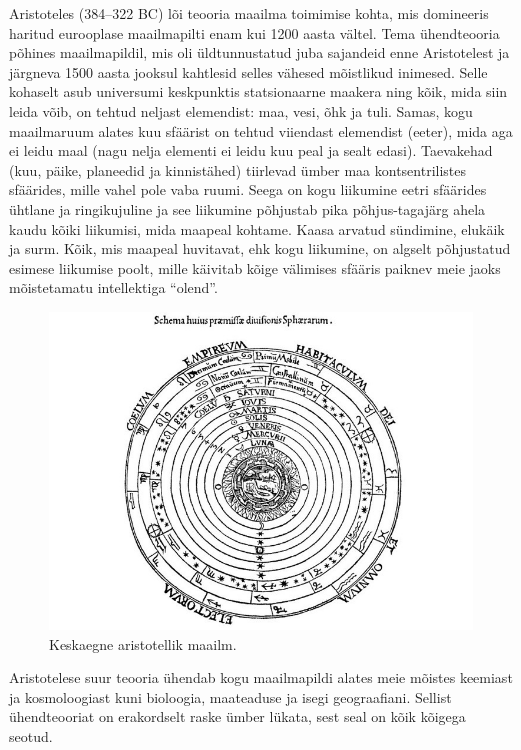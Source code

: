 \documentclass[]{book}
\begin{document}
Aristoteles (384--322 BC) lõi teooria maailma toimimise kohta, mis domineeris haritud eurooplase maailmapilti enam kui 1200 aasta vältel.
Tema ühendteooria põhines maailmapildil, mis oli üldtunnustatud juba sajandeid enne Aristotelest ja järgneva 1500 aasta jooksul kahtlesid selles vähesed mõistlikud inimesed.
Selle kohaselt asub universumi keskpunktis statsionaarne maakera ning kõik, mida siin leida võib, on tehtud neljast elemendist: maa, vesi, õhk ja tuli.
Samas, kogu maailmaruum alates kuu sfäärist on tehtud viiendast elemendist (eeter), mida aga ei leidu maal (nagu nelja elementi ei leidu kuu peal ja sealt edasi).
Taevakehad (kuu, päike, planeedid ja kinnistähed) tiirlevad ümber maa kontsentrilistes sfäärides, mille vahel pole vaba ruumi.
Seega on kogu liikumine eetri sfäärides ühtlane ja ringikujuline ja see liikumine põhjustab pika põhjus-tagajärg ahela kaudu kõiki liikumisi, mida maapeal kohtame.
Kaasa arvatud sündimine, elukäik ja surm.
Kõik, mis maapeal huvitavat, ehk kogu liikumine, on algselt põhjustatud esimese liikumise poolt, mille käivitab kõige välimises sfääris paiknev meie jaoks mõistetamatu intellektiga ``olend''.

\begin{figure}
\includegraphics[width=0.5\linewidth]{img/arist} \caption{Keskaegne aristotellik maailm.}\label{fig:unnamed-chunk-2}
\end{figure}

Aristotelese suur teooria ühendab kogu maailmapildi alates meie mõistes keemiast ja kosmoloogiast kuni bioloogia, maateaduse ja isegi geograafiani. Sellist ühendteooriat on erakordselt raske ümber lükata, sest seal on kõik kõigega seotud.
\end{document}

